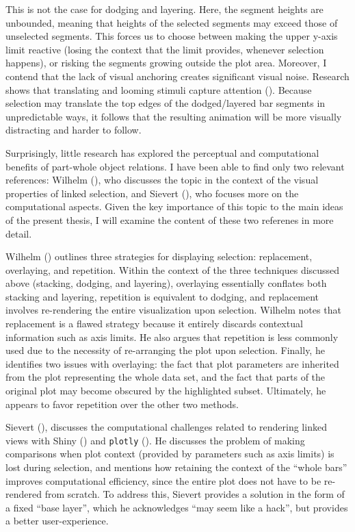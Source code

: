 \documentclass[
]{book}
\theoremstyle{definition}
\theoremstyle{definition}
\theoremstyle{definition}
\theoremstyle{definition}
\theoremstyle{remark}
\begin{document}
This is not the case for dodging and layering. Here, the segment heights are unbounded, meaning that heights of the selected segments may exceed those of unselected segments. This forces us to choose between making the upper y-axis limit reactive (losing the context that the limit provides, whenever selection happens), or risking the segments growing outside the plot area. Moreover, I contend that the lack of visual anchoring creates significant visual noise. Research shows that translating and looming stimuli capture attention (). Because selection may translate the top edges of the dodged/layered bar segments in unpredictable ways, it follows that the resulting animation will be more visually distracting and harder to follow.

Surprisingly, little research has explored the perceptual and computational benefits of part-whole object relations. I have been able to find only two relevant references: Wilhelm (), who discusses the topic in the context of the visual properties of linked selection, and Sievert (), who focuses more on the computational aspects. Given the key importance of this topic to the main ideas of the present thesis, I will examine the content of these two referenes in more detail.

Wilhelm () outlines three strategies for displaying selection: replacement, overlaying, and repetition. Within the context of the three techniques discussed above (stacking, dodging, and layering), overlaying essentially conflates both stacking and layering, repetition is equivalent to dodging, and replacement involves re-rendering the entire visualization upon selection. Wilhelm notes that replacement is a flawed strategy because it entirely discards contextual information such as axis limits. He also argues that repetition is less commonly used due to the necessity of re-arranging the plot upon selection. Finally, he identifies two issues with overlaying: the fact that plot parameters are inherited from the plot representing the whole data set, and the fact that parts of the original plot may become obscured by the highlighted subset. Ultimately, he appears to favor repetition over the other two methods.

Sievert (), discusses the computational challenges related to rendering linked views with Shiny () and \texttt{plotly} (). He discusses the problem of making comparisons when plot context (provided by parameters such as axis limits) is lost during selection, and mentions how retaining the context of the ``whole bars'' improves computational efficiency, since the entire plot does not have to be re-rendered from scratch. To address this, Sievert provides a solution in the form of a fixed ``base layer'', which he acknowledges ``may seem like a hack'', but provides a better user-experience.
\end{document}
